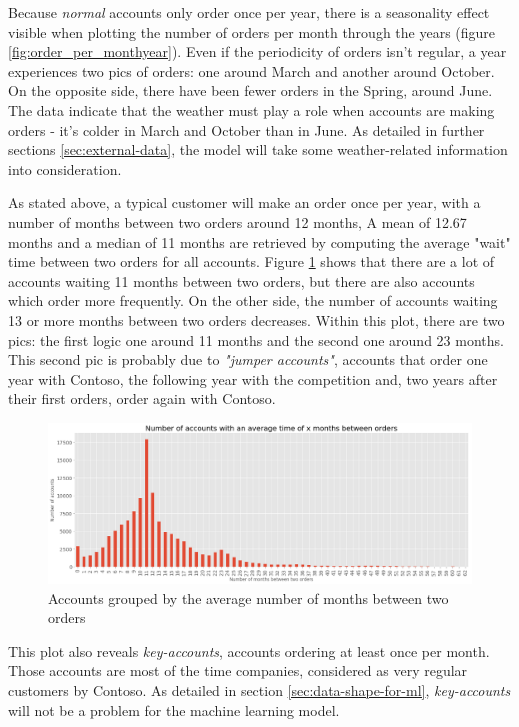 Because \textit{normal} accounts only order once per year, there is a seasonality effect visible when plotting the number of orders per month through  the years (figure \ref{fig:order_per_monthyear}). Even if the periodicity of orders isn't regular, a year experiences two pics of orders: one around March and another around October. On the opposite side, there have been fewer orders in the Spring, around June. The data indicate that the weather must play a role when accounts are making orders - it's colder in March and October than in June. As detailed in further sections \ref{sec:external-data}, the model will take some weather-related information into consideration.

As stated above, a typical customer will make an order once per year, with a number of months between two orders around 12 months, A mean of 12.67 months and a median of 11 months are retrieved by computing the average "wait" time between two orders for all accounts. Figure \ref{fig:orders-account-counts} shows that there are a lot of accounts waiting 11 months between two orders, but there are also accounts which order more frequently. On the other side, the number of accounts waiting 13 or more months between two orders decreases. Within this plot, there are two pics: the first logic one around 11 months and the second one around 23 months. This second pic is probably due to \textit{"jumper accounts"}, accounts that order one year with Contoso, the following year with the competition and, two years after their first orders, order again with Contoso. 

\begin{figure}[h]
    \centering
    \includegraphics[width=15cm]{images/accounts-average-time-orders.png}
    \caption[Average number of months between two orders]{Accounts grouped by the average number of months between two orders}
    \label{fig:orders-account-counts}
\end{figure}

This plot also reveals \textit{key-accounts}, accounts ordering at least once per month. Those accounts are most of the time companies, considered as very regular customers by Contoso. As detailed in section \ref{sec:data-shape-for-ml}, \textit{key-accounts} will not be a problem for the machine learning model.


